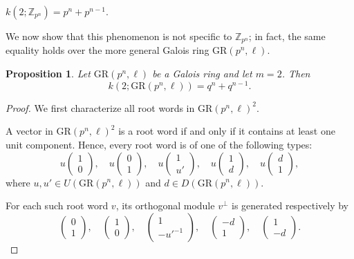\documentclass[10pt]{article}
\newtheorem{prop}[lem]{Proposition}
\theoremstyle{definition}
\begin{document}
 $k(2; \mathbb{Z}_{p^n})=p^n+p^{n-1}$.


We now show that this phenomenon is not specific to $\mathbb{Z}_{p^n}$; in fact, the same equality holds over the more general Galois ring $\mathrm{GR}(p^{n},\ell)$.



\begin{prop}
Let $\mathrm{GR}(p^{n},\ell)$ be a Galois ring and let $m=2$. Then
\[
k(2;\mathrm{GR}(p^{n},\ell)) = q^{n} + q^{n-1}.
\]

\end{prop}

\begin{proof}
We first characterize all root words in $\mathrm{GR}(p^{n},\ell)^2$.

A vector in $\mathrm{GR}(p^{n},\ell)^2$ is a root word if and only if it contains at least one unit component. Hence, every root word is of one of the following types:
\[
u\begin{pmatrix}1\\0\end{pmatrix}, \quad
u\begin{pmatrix}0\\1\end{pmatrix}, \quad
u\begin{pmatrix}1\\u'\end{pmatrix}, \quad
u\begin{pmatrix}1\\d\end{pmatrix}, \quad
u\begin{pmatrix}d\\1\end{pmatrix},
\]
where $u,u' \in U(\mathrm{GR}(p^{n},\ell))$ and $d \in D(\mathrm{GR}(p^{n},\ell))$.

For each such root word $v$, its orthogonal module $v^{\perp}$ is generated respectively by
\[
\begin{pmatrix}0\\1\end{pmatrix}, \quad
\begin{pmatrix}1\\0\end{pmatrix}, \quad
\begin{pmatrix}1\\ -{u'}^{-1}\end{pmatrix}, \quad
\begin{pmatrix}-d\\1\end{pmatrix}, \quad
\begin{pmatrix}1\\-d\end{pmatrix}.
\]


\end{proof}
\end{document}
